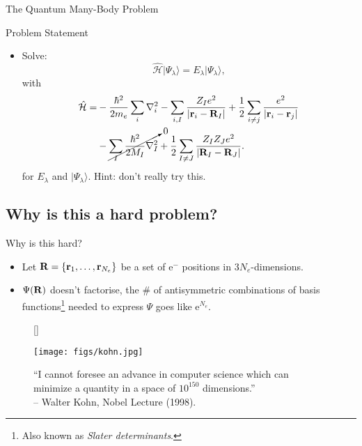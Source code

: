 \documentclass[12pt, pdf, hyperref={draft}, usenames, dvipsnames]{beamer}
\newcommand{\e}{\mathrm{e}}
\newcommand{\ket}[1]{\lvert{#1}\rangle}
\newcommand{\red}[1]{{\bf\color{LancsRed}{#1}}}
\begin{document}
\begin{frame}{The Quantum Many-Body Problem}
\begin{block}{Problem Statement}
  \begin{itemize}
    \item Solve:
    \begin{equation}
      \mathcal{\hat H}\ket{\Psi_\lambda} = E_\lambda\ket{\Psi_\lambda},
    \end{equation}
    with
    \begin{align}
      \mathcal{\hat H} = &-\dfrac{\hbar^2}{2m_e}\sum_i \nabla^2_i
      -\sum_{i,I} \dfrac{Z_I e^2}{\lvert {\bf r}_i - {\bf R}_I\rvert}
      +\dfrac{1}{2}
      \sum_{i \neq j}\dfrac{e^2}{\lvert {\bf r}_i -
      {\bf r}_j\rvert} \nonumber \\
      &- \cancelto{\text{0}}{\sum_I \dfrac{\hbar^2}{2M_I}\nabla^2_I} +
      \dfrac{1}{2}
      \sum_{I \neq J} \dfrac{Z_I Z_J e^2}{\lvert {\bf R}_I - {\bf R}_J \rvert}.
    \end{align}
    for $E_\lambda$ and $\ket{\Psi_\lambda}$. Hint: don't really try this.
  \end{itemize}
\end{block}
\end{frame}

\subsection{Why is this a hard problem?}
\begin{frame}{Why is this hard?}
\begin{itemize}
  \item Let ${\bf R} = \{ {\bf r}_1, \ldots, {\bf r}_{N_e} \}$ be a set of
  e$^-$ positions in $3N_e$-dimensions.

  \item \red{Curse of dimensionality:} $\Psi({\bf R})$ doesn't
  factorise, the \# of antisymmetric combinations of basis
  functions\footnote{Also known as \textit{Slater
  determinants}.} needed to express $\Psi$ goes like $\e^{N_e}$.
\end{itemize}

\begin{figure}[H]
  [\FBwidth]
  {\caption*{``I cannot foresee an advance in computer science which can
  minimize a quantity in a space of $10^{150}$ dimensions.'' \\ \hfill
-- Walter Kohn, Nobel Lecture (1998).}\label{fig:kohn}}
  {\texttt{[image: figs/kohn.jpg]}}
\end{figure}

\end{frame}
\end{document}
